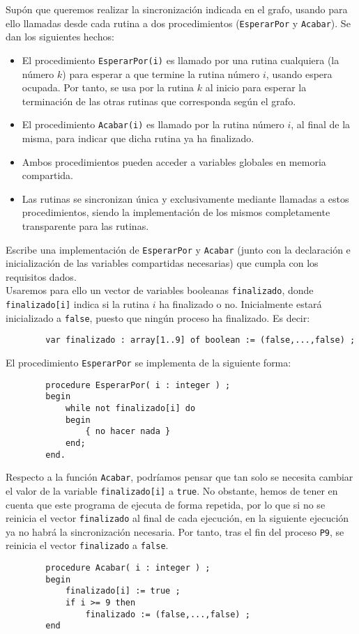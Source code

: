 \begin{ejercicio}
    Supón que queremos realizar la sincronización indicada en el grafo, usando para ello llamadas
    desde cada rutina a dos procedimientos (\verb|EsperarPor| y \verb|Acabar|). Se dan los siguientes hechos:
    \begin{itemize}
        \item El procedimiento \verb|EsperarPor(i)| es llamado por una rutina cualquiera (la número $k$) para esperar a que termine la rutina número $i$, usando espera ocupada. Por tanto, se usa por la rutina $k$ al inicio para esperar la terminación de las otras rutinas que corresponda según el grafo.
        \item El procedimiento \verb|Acabar(i)| es llamado por la rutina número $i$, al final de la misma, para indicar que dicha rutina ya ha finalizado.
        \item Ambos procedimientos pueden acceder a variables globales en memoria compartida.
        \item Las rutinas se sincronizan única y exclusivamente mediante llamadas a estos procedimientos, siendo la implementación de los mismos completamente transparente para las rutinas.
    \end{itemize}
    Escribe una implementación de \verb|EsperarPor| y \verb|Acabar| (junto con la declaración e inicialización de las variables compartidas necesarias) que cumpla con los requisitos dados.\\

    Usaremos para ello un vector de variables booleanas \verb|finalizado|, donde \verb|finalizado[i]| indica si la rutina $i$ ha finalizado o no. Inicialmente estará inicializado a \verb|false|, puesto que ningún proceso ha finalizado. Es decir:
    \begin{verbatim}
        var finalizado : array[1..9] of boolean := (false,...,false) ;
    \end{verbatim}

    El procedimiento \verb|EsperarPor| se implementa de la siguiente forma:
    \begin{verbatim}
        procedure EsperarPor( i : integer ) ;
        begin
            while not finalizado[i] do
            begin
                { no hacer nada }
            end;
        end.
    \end{verbatim}

    Respecto a la función \verb|Acabar|, podríamos pensar que tan solo se necesita cambiar el valor de la variable \verb|finalizado[i]| a \verb|true|. No obstante, hemos de tener en cuenta que este programa de ejecuta de forma repetida, por lo que si no se reinicia el vector \verb|finalizado| al final de cada ejecución, en la siguiente ejecución ya no habrá la sincronización necesaria. Por tanto, tras el fin del proceso \verb|P9|, se reinicia el vector \verb|finalizado| a \verb|false|.
    \begin{verbatim}
        procedure Acabar( i : integer ) ;
        begin
            finalizado[i] := true ;
            if i >= 9 then
                finalizado := (false,...,false) ;
        end
    \end{verbatim}
    
\end{ejercicio}


